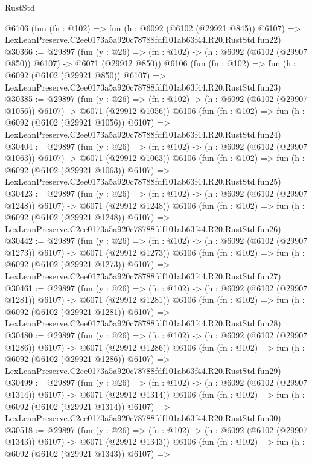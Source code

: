 \begin{lexlean}{RustStd}
\begin{coremodule}
    @6106
    (fun (fn : @102) =>
    fun (h : @6092 (@6102 (@29921 @845)) @6107) =>
    LexLeanPreserve.C2ee0173a5a920c78788fdf101ab63f44.R20.RustStd.fun22)
@30366 := @29897
    (fun (y : @26) => (fn : @102) -> (h : @6092 (@6102 (@29907 @850)) @6107) -> @6071 (@29912 @850))
    @6106
    (fun (fn : @102) =>
    fun (h : @6092 (@6102 (@29921 @850)) @6107) =>
    LexLeanPreserve.C2ee0173a5a920c78788fdf101ab63f44.R20.RustStd.fun23)
@30385 := @29897
    (fun (y : @26) =>
    (fn : @102) -> (h : @6092 (@6102 (@29907 @1056)) @6107) -> @6071 (@29912 @1056))
    @6106
    (fun (fn : @102) =>
    fun (h : @6092 (@6102 (@29921 @1056)) @6107) =>
    LexLeanPreserve.C2ee0173a5a920c78788fdf101ab63f44.R20.RustStd.fun24)
@30404 := @29897
    (fun (y : @26) =>
    (fn : @102) -> (h : @6092 (@6102 (@29907 @1063)) @6107) -> @6071 (@29912 @1063))
    @6106
    (fun (fn : @102) =>
    fun (h : @6092 (@6102 (@29921 @1063)) @6107) =>
    LexLeanPreserve.C2ee0173a5a920c78788fdf101ab63f44.R20.RustStd.fun25)
@30423 := @29897
    (fun (y : @26) =>
    (fn : @102) -> (h : @6092 (@6102 (@29907 @1248)) @6107) -> @6071 (@29912 @1248))
    @6106
    (fun (fn : @102) =>
    fun (h : @6092 (@6102 (@29921 @1248)) @6107) =>
    LexLeanPreserve.C2ee0173a5a920c78788fdf101ab63f44.R20.RustStd.fun26)
@30442 := @29897
    (fun (y : @26) =>
    (fn : @102) -> (h : @6092 (@6102 (@29907 @1273)) @6107) -> @6071 (@29912 @1273))
    @6106
    (fun (fn : @102) =>
    fun (h : @6092 (@6102 (@29921 @1273)) @6107) =>
    LexLeanPreserve.C2ee0173a5a920c78788fdf101ab63f44.R20.RustStd.fun27)
@30461 := @29897
    (fun (y : @26) =>
    (fn : @102) -> (h : @6092 (@6102 (@29907 @1281)) @6107) -> @6071 (@29912 @1281))
    @6106
    (fun (fn : @102) =>
    fun (h : @6092 (@6102 (@29921 @1281)) @6107) =>
    LexLeanPreserve.C2ee0173a5a920c78788fdf101ab63f44.R20.RustStd.fun28)
@30480 := @29897
    (fun (y : @26) =>
    (fn : @102) -> (h : @6092 (@6102 (@29907 @1286)) @6107) -> @6071 (@29912 @1286))
    @6106
    (fun (fn : @102) =>
    fun (h : @6092 (@6102 (@29921 @1286)) @6107) =>
    LexLeanPreserve.C2ee0173a5a920c78788fdf101ab63f44.R20.RustStd.fun29)
@30499 := @29897
    (fun (y : @26) =>
    (fn : @102) -> (h : @6092 (@6102 (@29907 @1314)) @6107) -> @6071 (@29912 @1314))
    @6106
    (fun (fn : @102) =>
    fun (h : @6092 (@6102 (@29921 @1314)) @6107) =>
    LexLeanPreserve.C2ee0173a5a920c78788fdf101ab63f44.R20.RustStd.fun30)
@30518 := @29897
    (fun (y : @26) =>
    (fn : @102) -> (h : @6092 (@6102 (@29907 @1343)) @6107) -> @6071 (@29912 @1343))
    @6106
    (fun (fn : @102) =>
    fun (h : @6092 (@6102 (@29921 @1343)) @6107) =>

\end{coremodule}
\end{lexlean}
